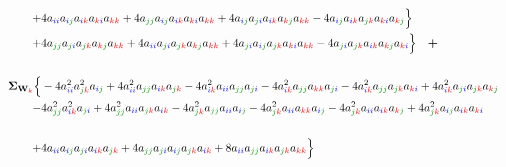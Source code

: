 \documentclass{article}
\begin{document}
\begin{equation}
\begin{aligned}
\\
+ & 4 a_{\idx{i}{i}} a_{\idx{i}{j}} a_{\idx{i}{k}} a_{\idx{k}{i}} a_{\idx{k}{k}} + 4 a_{\idx{j}{j}} a_{\idx{i}{j}} a_{\idx{i}{k}} a_{\idx{k}{i}} a_{\idx{k}{k}} + 4 a_{\idx{i}{j}} a_{\idx{j}{i}} a_{\idx{i}{k}} a_{\idx{k}{j}} a_{\idx{k}{k}} - 4 a_{\idx{i}{j}} a_{\idx{i}{k}} a_{\idx{j}{k}} a_{\idx{k}{i}} a_{\idx{k}{j}}\Bigr\} \\
+ & 4 a_{\idx{j}{j}} a_{\idx{j}{i}} a_{\idx{j}{k}} a_{\idx{k}{j}} a_{\idx{k}{k}} + 4 a_{\idx{i}{i}} a_{\idx{j}{i}} a_{\idx{j}{k}} a_{\idx{k}{j}} a_{\idx{k}{k}} + 4 a_{\idx{j}{i}} a_{\idx{i}{j}} a_{\idx{j}{k}} a_{\idx{k}{i}} a_{\idx{k}{k}} - 4 a_{\idx{j}{i}} a_{\idx{j}{k}} a_{\idx{i}{k}} a_{\idx{k}{j}} a_{\idx{k}{i}}\Bigr\} \quad \textbf{+} \\
\\
\mathbf{\Sigma}_{\textbf{W}_{\cidx{k}}} \Bigl\{& -4a_{\idx{i}{i}}^{2} a_{\idx{j}{k}}^{2} a_{\idx{i}{j}} + 4 a_{\idx{i}{i}}^{2} a_{\idx{j}{j}} a_{\idx{i}{k}} a_{\idx{j}{k}} - 4 a_{\idx{i}{k}}^{2} a_{\idx{i}{i}} a_{\idx{j}{j}} a_{\idx{j}{i}} - 4 a_{\idx{i}{k}}^{2} a_{\idx{j}{j}} a_{\idx{k}{k}} a_{\idx{j}{i}} - 4 a_{\idx{i}{k}}^{2} a_{\idx{j}{j}} a_{\idx{j}{k}} a_{\idx{k}{i}} + 4 a_{\idx{i}{k}}^{2} a_{\idx{j}{i}} a_{\idx{j}{k}} a_{\idx{k}{j}} \\
- & 4 a_{\idx{j}{j}}^{2} a_{\idx{i}{k}}^{2} a_{\idx{j}{i}} + 4 a_{\idx{j}{j}}^{2} a_{\idx{i}{i}} a_{\idx{j}{k}} a_{\idx{i}{k}} - 4 a_{\idx{j}{k}}^{2} a_{\idx{j}{j}} a_{\idx{i}{i}} a_{\idx{i}{j}} - 4 a_{\idx{j}{k}}^{2} a_{\idx{i}{i}} a_{\idx{k}{k}} a_{\idx{i}{j}} - 4 a_{\idx{j}{k}}^{2} a_{\idx{i}{i}} a_{\idx{i}{k}} a_{\idx{k}{j}} + 4 a_{\idx{j}{k}}^{2} a_{\idx{i}{j}} a_{\idx{i}{k}} a_{\idx{k}{i}}\\
\\
+ & 4 a_{\idx{i}{i}} a_{\idx{i}{j}} a_{\idx{j}{i}} a_{\idx{i}{k}} a_{\idx{j}{k}} + 4 a_{\idx{j}{j}} a_{\idx{j}{i}} a_{\idx{i}{j}} a_{\idx{j}{k}} a_{\idx{i}{k}} + 8 a_{\idx{i}{i}} a_{\idx{j}{j}} a_{\idx{i}{k}} a_{\idx{j}{k}} a_{\idx{k}{k}}\Bigr\}
\end{aligned}
\label{eq:network3by3_sigma_ij_v2}
\end{equation}
\end{document}
